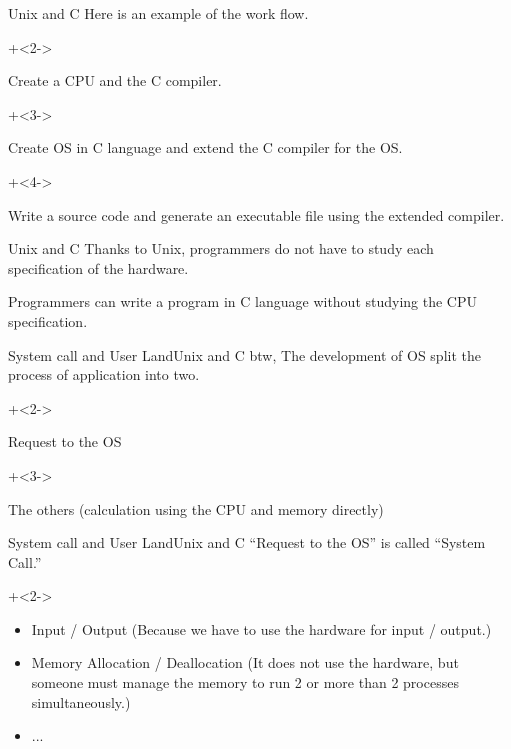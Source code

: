 \begin{frame}{Unix and C}{}
    Here is an example of the work flow.
    \vspace{4ex}

    \begin{enumerate}
        \onslide+<2->{\item Create a CPU and the C compiler.}
        \onslide+<3->{\item Create OS in C language and extend the C compiler for the OS.}
        \onslide+<4->{\item Write a source code and generate an executable file using the extended compiler.}
    \end{enumerate}
\end{frame}


\begin{frame}{Unix and C}{}
    Thanks to Unix, programmers do not have to study each specification of the hardware.
    \vspace{4ex}

    Programmers can write a program in C language without studying the CPU specification.
\end{frame}


\begin{frame}{System call and User Land}{Unix and C}
    btw, The development of OS split the process of application into two.
    \vspace{4ex}

    \begin{itemize}
        \onslide+<2->{\item Request to the OS}
        \onslide+<3->{\item The others (calculation using the CPU and memory directly)}
    \end{itemize}
\end{frame}


\begin{frame}{System call and User Land}{Unix and C}
    ``Request to the OS'' is called ``System Call.''
    \vspace{4ex}

    \onslide+<2->{
        \begin{itemize}
            \item Input / Output (Because we have to use the hardware for input / output.)
            \item Memory Allocation / Deallocation (It does not use the hardware, but someone must manage the memory to run 2 or more than 2 processes simultaneously.)
            \item ...
        \end{itemize}
    }
\end{frame}


